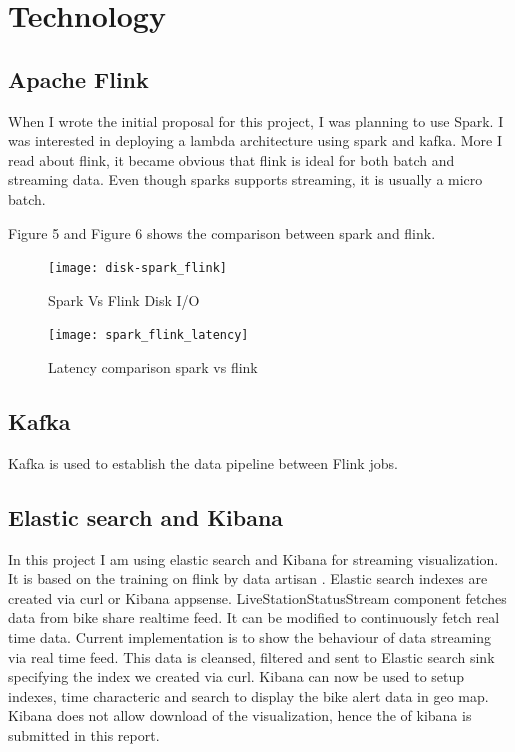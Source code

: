 \documentclass{sig-alternate-05-2015}
\begin{document}
\section{Technology}


\subsection{Apache Flink}
When I wrote the initial proposal for this project, I was planning to use Spark. I was interested in deploying a lambda architecture using spark and kafka. More I read about flink, it became obvious that flink is ideal for both batch and streaming data. Even though sparks supports streaming, it is usually a micro batch.

\cite{kjacobs} Figure 5 and Figure 6 shows the comparison between spark and flink.

\begin{figure}[!ht]
\texttt{[image: disk-spark\_flink]}
 \caption{Spark Vs Flink Disk I/O}\label{F:small}
\end{figure}

\begin{figure}[!ht]
\texttt{[image: spark\_flink\_latency]}
 \caption{Latency comparison spark vs flink}\label{F:small}
\end{figure}
\break
\break

\subsection{Kafka}
Kafka is used to establish the data pipeline between Flink jobs.


\subsection{Elastic search and Kibana}
In this project I am using elastic search and Kibana for streaming visualization. It is based on the training on flink by data artisan \cite{artisan}. Elastic search indexes are created via curl or Kibana appsense. LiveStationStatusStream component fetches data from bike share realtime feed. It can be modified to continuously fetch real time data. Current implementation is to show the behaviour of data streaming via real time feed. This data is cleansed, filtered and sent to Elastic search sink specifying the index we created via curl. Kibana can now be used to setup indexes, time characteric and search to display the bike alert data in geo map. Kibana does not allow download of the visualization, hence the   of kibana is submitted in this report.
\end{document}
